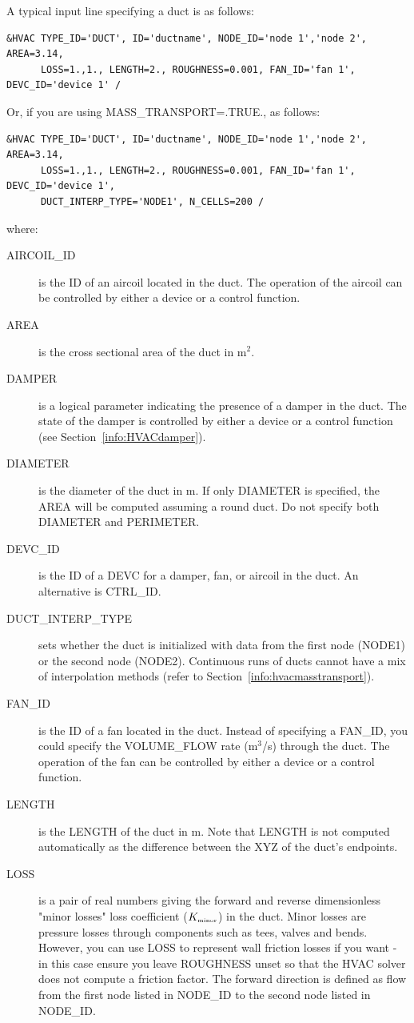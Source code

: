 \documentclass[11pt]{book}
\begin{document}
A typical input line specifying a duct is as follows:
\begin{lstlisting}
&HVAC TYPE_ID='DUCT', ID='ductname', NODE_ID='node 1','node 2', AREA=3.14,
      LOSS=1.,1., LENGTH=2., ROUGHNESS=0.001, FAN_ID='fan 1', DEVC_ID='device 1' /
\end{lstlisting}
Or, if you are using {\ct MASS\_TRANSPORT=.TRUE.}, as follows:
\begin{lstlisting}
&HVAC TYPE_ID='DUCT', ID='ductname', NODE_ID='node 1','node 2', AREA=3.14,
      LOSS=1.,1., LENGTH=2., ROUGHNESS=0.001, FAN_ID='fan 1', DEVC_ID='device 1',
      DUCT_INTERP_TYPE='NODE1', N_CELLS=200 /
\end{lstlisting}
where:
\begin{description}
\item[{\ct AIRCOIL\_ID}] is the {\ct ID} of an aircoil located in the duct.  The operation of the aircoil can be controlled by either a device or a control function.
\item[{\ct AREA}] is the cross sectional area of the duct in m$^2$.
\item[{\ct DAMPER}] is a logical parameter indicating the presence of a damper in the duct. The state of the damper is controlled by either a device or a control function (see Section~\ref{info:HVACdamper}).
\item[{\ct DIAMETER}] is the diameter of the duct in m.  If only {\ct DIAMETER} is specified, the {\ct AREA} will be computed assuming a round duct.  Do not specify both {\ct DIAMETER} and {\ct PERIMETER}.
\item[{\ct DEVC\_ID}]  is the {\ct ID} of a {\ct DEVC} for a damper, fan, or aircoil in the duct. An alternative is {\ct CTRL\_ID}.
\item[{\ct DUCT\_INTERP\_TYPE}] sets whether the duct is initialized with data from the first node ({\ct NODE1}) or the second node ({\ct NODE2}). Continuous runs of ducts cannot have a mix of interpolation methods (refer to Section~\ref{info:hvacmasstransport}).
\item[{\ct FAN\_ID}] is the {\ct ID} of a fan located in the duct. Instead of specifying a {\ct FAN\_ID}, you could specify the {\ct VOLUME\_FLOW} rate (m$^3$/s) through the duct. The operation of the fan can be controlled by either a device or a control function.
\item[{\ct LENGTH}] is the {\ct LENGTH} of the duct in m.  Note that {\ct LENGTH} is not computed automatically as the difference between the {\ct XYZ} of the duct's endpoints.
\item[{\ct LOSS}] is a pair of real numbers giving the forward and reverse dimensionless "minor losses" loss coefficient (\(K_{\mbox{\tiny minor}}\)) in the duct. Minor losses are pressure losses through components such as tees, valves and bends. However, you can use {\ct LOSS} to represent wall friction losses if you want - in this case ensure you leave {\ct ROUGHNESS} unset so that the HVAC solver does not compute a friction factor. The forward direction is defined as flow from the first node listed in {\ct NODE\_ID} to the second node listed in {\ct NODE\_ID}.

\end{description}
\end{document}
